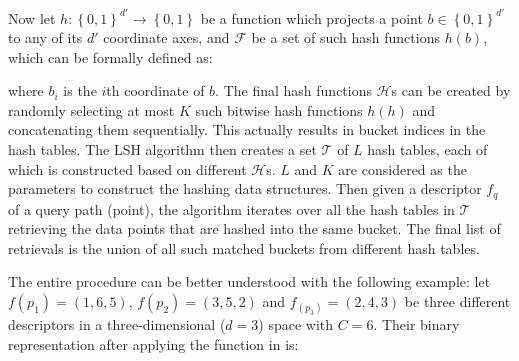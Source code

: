 Now let $h:\left\{0,1\right\}^{d'}\rightarrow\left\{0,1\right\}$ be a function which projects a point $b\in \left\{0,1\right\}^{d'}$ to any of its $d'$ coordinate axes, and $\mathcal{F}$ be a set of such hash functions $h(b)$, which can be formally defined as:


where $b_i$ is the $i$th coordinate of $b$. The final hash functions $\mathcal{H}$s can be created by randomly selecting at most $K$ such bitwise hash functions $h(h)$ and concatenating them sequentially. This actually results in bucket indices in the hash tables. The LSH algorithm then creates a set $\mathcal{T}$ of $L$ hash tables, each of which is constructed based on different $\mathcal{H}$s. $L$ and $K$ are considered as the parameters to construct the hashing data structures. Then given a descriptor $f_q$ of a query path (point), the algorithm iterates over all the hash tables in $\mathcal{T}$ retrieving the data points that are hashed into the same bucket. The final list of retrievals is the union of all such matched buckets from different hash tables.

The entire procedure can be better understood with the following example: let $f(p_1)=(1,6,5)$, $f(p_2)=(3,5,2)$ and $f_(p_3)=(2,4,3)$ be three different descriptors in a three-dimensional ($d=3$) space with $C=6$. Their binary representation after applying the function in  is:




